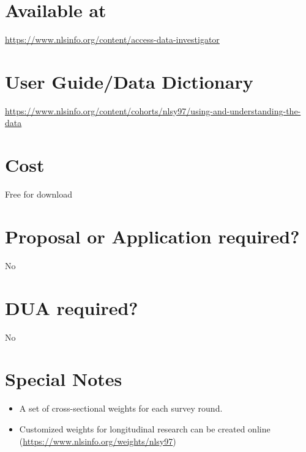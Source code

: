 \documentclass[
]{book}
\providecommand{\tightlist}{%
  \setlength{\itemsep}{0pt}\setlength{\parskip}{0pt}}
\begin{document}
\hypertarget{available-at-59}{%
\section{Available at}\label{available-at-59}}

\url{https://www.nlsinfo.org/content/access-data-investigator}

\hypertarget{user-guidedata-dictionary-59}{%
\section{User Guide/Data Dictionary}\label{user-guidedata-dictionary-59}}

\url{https://www.nlsinfo.org/content/cohorts/nlsy97/using-and-understanding-the-data}

\hypertarget{cost-59}{%
\section{Cost}\label{cost-59}}

Free for download

\hypertarget{proposal-or-application-required-59}{%
\section{Proposal or Application required?}\label{proposal-or-application-required-59}}

No

\hypertarget{dua-required-59}{%
\section{DUA required?}\label{dua-required-59}}

No

\hypertarget{special-notes-59}{%
\section{Special Notes}\label{special-notes-59}}

\begin{itemize}
\tightlist
\item
  A set of cross-sectional weights for each survey round.
\item
  Customized weights for longitudinal research can be created online (\url{https://www.nlsinfo.org/weights/nlsy97})
\end{itemize}

\mainmatter
\end{document}
